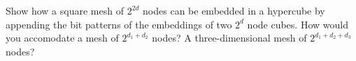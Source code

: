   Show how a square mesh of $2^{2d}$ nodes can be embedded in a
  hypercube by appending the bit patterns of the embeddings of two
  $2^d$ node cubes. How would you accomodate a mesh of $2^{d_1+d_2}$
  nodes? A three-dimensional mesh of $2^{d_1+d_2+d_3}$ nodes?
